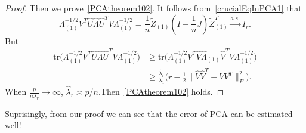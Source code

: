 \begin{proof}
    Then we prove~\eqref{PCAtheorem102}. It follows from~\eqref{crucialEqInPCA1} that
    \begin{equation}\label{crucialEqInPCA2}
        \Lambda^{-1/2}_{(1)}V^T \hat{U}\hat{\Lambda}\hat{U}^T V\Lambda^{-1/2}_{(1)}=
        \frac{1}{n}\tilde{Z}_{(1)}(I-\frac{1}{n}J)\tilde{Z}_{(1)}^T\xrightarrow{a.s.} I_{r}.
    \end{equation}
But
    \begin{equation}
        \begin{aligned}
        \mathrm{tr}\big(\Lambda^{-1/2}_{(1)}V^T \hat{U}\hat{\Lambda}\hat{U}^T V\Lambda^{-1/2}_{(1)}\big)
            &\geq
        \mathrm{tr}\big(\Lambda^{-1/2}_{(1)}V^T \hat{V}\hat{\Lambda}_{(1)}\hat{V}^T V\Lambda^{-1/2}_{(1)}\big)
            \\
            &\geq
            \frac{\hat{\lambda}_r}{\lambda_1}\Big(r-\frac{1}{2}\|\hat{V}\hat{V}^T-VV^T\|^2_F\Big).
        \end{aligned}
    \end{equation}
When $\frac{p}{n\lambda_r}\to \infty$, $\hat{\lambda}_r\asymp p/n$.Then~\eqref{PCAtheorem102} holds.

\end{proof}



Suprisingly, from our proof we can see that the error of PCA can be estimated well!
